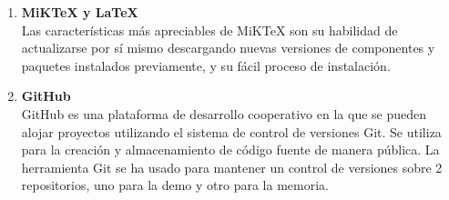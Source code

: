 \begin{enumerate}

\item \textbf{MiKTeX y LaTeX}\\



 Las caracter\'isticas m\'as apreciables de MiKTeX son su habilidad de actualizarse por s\'i mismo descargando nuevas versiones de componentes y paquetes instalados previamente, y su f\'acil proceso de instalaci\'on. \\



\item \textbf{GitHub}\\



 GitHub es una plataforma de desarrollo cooperativo en la que se pueden alojar proyectos utilizando el sistema de control de versiones Git. Se utiliza para la creaci\'on y almacenamiento de c\'odigo fuente de manera p\'ublica. La herramienta Git se ha usado para mantener un control de versiones sobre 2 repositorios, uno para la demo y otro para la memoria. \\

\end{enumerate}



